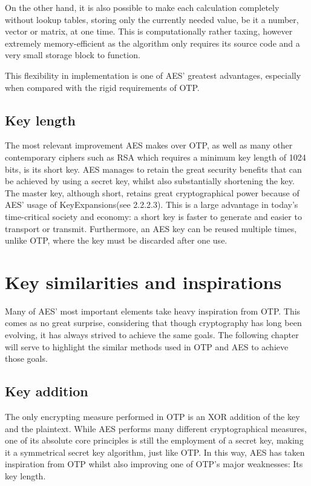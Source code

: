 \documentclass[12pt]{report}
\theoremstyle{definition}
\theoremstyle{remark}
\begin{document}
On the other hand, it is also possible to make each calculation completely without lookup tables, storing only the currently needed value, be it a number, vector or matrix, at one time. This is computationally rather taxing, however extremely memory-efficient as the algorithm only requires its source code and a very small storage block to function.

This flexibility in implementation is one of AES' greatest advantages, especially when compared with the rigid requirements of OTP.

\subsection{Key length}
The most relevant improvement AES makes over OTP, as well as many other contemporary ciphers such as RSA which requires a minimum key length of 1024 bits, is its short key. AES manages to retain the great security benefits that can be achieved by using a secret key, whilst also substantially shortening the key. The master key, although short, retains great cryptographical power because of AES' usage of KeyExpansions(see 2.2.2.3). This is a large advantage in today's time-critical society and economy: a short key is faster to generate and easier to transport or transmit. Furthermore, an AES key can be reused multiple times, unlike OTP, where the key must be discarded after one use.


\section{Key similarities and inspirations}
Many of AES' most important elements take heavy inspiration from OTP. This comes as no great surprise, considering that though cryptography has long been evolving, it has always strived to achieve the same goals. The following chapter will serve to highlight the similar methods used in OTP and AES to achieve those goals.

\subsection{Key addition}
The only encrypting measure performed in OTP is an XOR addition of the key and the plaintext. While AES performs many different cryptographical measures, one of its absolute core principles is still the employment of a secret key, making it a symmetrical secret key algorithm, just like OTP. In this way, AES has taken inspiration from OTP whilst also improving one of OTP's major weaknesses: Its key length.
\end{document}
